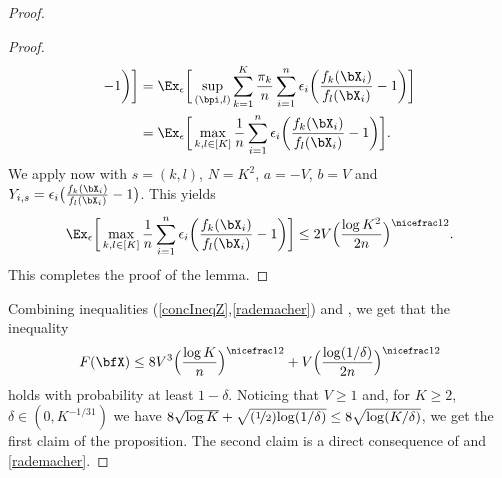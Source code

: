 \begin{proof}
\begin{proof}
\begin{align}
				-1\bigg) \bigg]
		&= \Ex_{\epsilon}\bigg[ \sup_{(\bpi,l)} \sum_{k=1}^K \frac{\pi_k}{n}\sum_{i=1}^n \epsilon_i
				\bigg(\frac{f_{k}(\bX_i)}{f_l(\bX_i)} -1\bigg)  \bigg]\\
		&=\Ex_{\epsilon}\bigg[ \max_{k,l\in[K]} \frac{1}{n}\sum_{i=1}^n \epsilon_i
				\bigg(\frac{f_{k}(\bX_i)}{f_l(\bX_i)} -1\bigg) \bigg].
\end{align}
We apply now  with $s= (k,l)$, $N = K^2$, $a=-V$, $b= V$ and $Y_{i,s} = \epsilon_i
\big(\frac{f_{k}(\bX_i)}{f_l(\bX_i)} -1\big)$. This yields
\begin{align}
\Ex_{\epsilon}\bigg[ \max_{k,l\in[K]}  \frac{1}{n}\sum_{i=1}^n \epsilon_i
				\bigg(\frac{f_{k}(\bX_i)}{f_l(\bX_i)} -1\bigg) \bigg]
    \le 2V \Big(\frac{\log K^2}{2n}\Big)^{\nicefrac12}.
\end{align}
This completes the proof of the lemma.
\end{proof}
Combining inequalities (\ref{concIneqZ},\ref{rademacher}) and , we get that the inequality
\begin{equation}
F(\bfX) \le 8V^3\Big(\frac{\log K}{n}\Big)^{\nicefrac12}+ V\Big(\frac{\log(1/\delta)}{2n}\Big)^{\nicefrac12}
\end{equation}
holds with probability at least $1-\delta$. Noticing that $V\ge 1$ and, for $K\ge 2$, $\delta\in(0,K^{-1/31})$
we have $8\sqrt{\log K}+ \sqrt{(\nicefrac12){\log(1/\delta)}}\le 8\sqrt{\log(K/\delta)}$,
we get the first claim of the proposition. The second claim is a direct consequence
of  and \eqref{rademacher}.
\end{proof}

